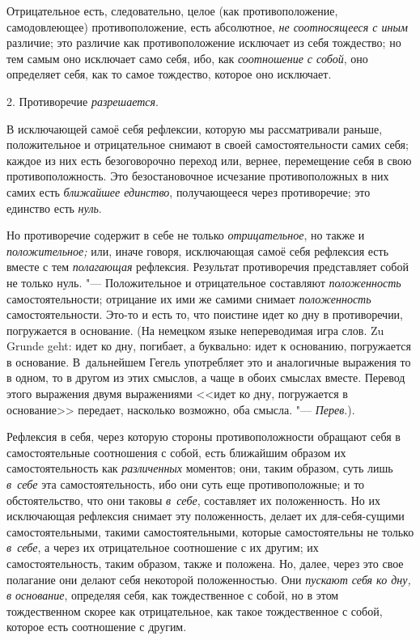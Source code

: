 Отрицательное есть, следовательно, целое (как противоположение,
самодовлеющее) противоположение, есть абсолютное,
{\em не соотносящееся с иным} различие; это различие
как противоположение исключает из себя тождество; но тем самым оно
исключает само себя, ибо, как {\em соотношение с
собой}, оно определяет себя, как то самое тождество, которое оно исключает.


\bigskip

2. Противоречие {\em разрешается}.

В исключающей самоё себя рефлексии, которую мы рассматривали раньше,
положительное и отрицательное снимают в своей самостоятельности самих себя;
каждое из них есть безоговорочно переход или, вернее, перемещение себя в
свою противоположность. Это безостановочное исчезание противоположных в них
самих есть {\em ближайшее единство}, получающееся через
противоречие; это единство есть {\em нуль}.

Но противоречие содержит в себе не только {\em отрицательное}, но также и
{\em положительное;} или, иначе говоря, исключающая
самоё себя рефлексия есть вместе с тем {\em полагающая}
рефлексия. Результат противоречия представляет собой не только нуль. "---
Положительное и отрицательное составляют
{\em положенность} самостоятельности; отрицание их ими
же самими снимает {\em положенность} самостоятельности.
Это-то и есть то, что поистине идет ко дну в противоречии, погружается в
основание. (На немецком языке непереводимая игра слов. Zu Grunde geht: идет
ко дну, погибает, а буквально: идет к основанию, погружается в основание.
В~дальнейшем Гегель употребляет это и аналогичные выражения то в одном, то в
другом из этих смыслов, а чаще в обоих смыслах вместе. Перевод этого
выражения двумя выражениями <<идет ко дну, погружается в основание>>
передает, насколько возможно, оба смысла. "---
{\em Перев}.).

Рефлексия в себя, через которую стороны противоположности обращают себя в
самостоятельные соотношения с собой, есть ближайшим образом их
самостоятельность как {\em различенных} моментов; они,
таким образом, суть лишь {\em в~себе} эта
самостоятельность, ибо они суть еще противоположные; и то обстоятельство,
что они таковы {\em в~себе}, составляет их
положенность. Но их исключающая рефлексия снимает эту положенность, делает
их для-себя-сущими самостоятельными, такими самостоятельными, которые
самостоятельны не только {\em в~себе}, а через их
отрицательное соотношение с их другим; их самостоятельность, таким образом,
также и положена. Но, далее, через это свое полагание они делают себя
некоторой положенностью. Они {\em пускают себя ко дну,
в основание}, определяя себя, как тождественное с собой, но в этом
тождественном скорее как отрицательное, как такое тождественное с собой,
которое есть соотношение с другим.

